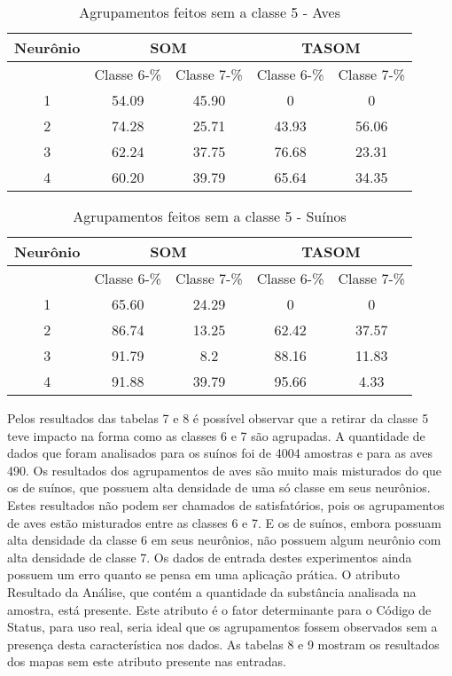 \begin{table}[h]
\centering
\caption{Agrupamentos feitos sem a classe 5 - Aves}
\label{my-label}
\begin{tabular}{|c|c|c|c|c|}
\hline
Neurônio & \multicolumn{2}{c|}{SOM} & \multicolumn{2}{c|}{TASOM} \\ \hline
         & Classe 6-\%    & Classe 7-\%   & Classe 6-\%     & Classe 7-\%   \\ \hline
1        & 54.09       & 45.90      & 0            & 0           \\ \hline
2        & 74.28           & 25.71          & 43.93        & 56.06       \\ \hline
3        & 62.24           & 37.75          & 76.68        & 23.31       \\ \hline
4        & 60.20       & 39.79      & 65.64        & 34.35       \\ \hline
\end{tabular}
\end{table}

\begin{table}[h]
\centering
\caption{Agrupamentos feitos sem a classe 5 - Suínos}
\label{my-label}
\begin{tabular}{|c|c|c|c|c|}
\hline
Neurônio & \multicolumn{2}{c|}{SOM} & \multicolumn{2}{c|}{TASOM} \\ \hline
         & Classe 6-\%    & Classe 7-\%   & Classe 6-\%     & Classe 7-\%    \\ \hline
1        & 65.60       & 24.29      & 0            & 0           \\ \hline
2        & 86.74           & 13.25          & 62.42        & 37.57       \\ \hline
3        & 91.79           & 8.2          & 88.16        & 11.83       \\ \hline
4        & 91.88       & 39.79      & 95.66        & 4.33        \\ \hline
\end{tabular}
\end{table}

Pelos resultados das tabelas 7 e 8 é possível observar que a retirar da classe 5 teve impacto na forma como as classes 6 e 7 são agrupadas. A quantidade de dados que foram analisados para os suínos foi de 4004 amostras e para as aves 490. Os resultados dos agrupamentos de aves são muito mais misturados do que os de suínos, que possuem alta densidade de uma só classe em seus neurônios. Estes resultados não podem ser chamados de satisfatórios, pois os agrupamentos de aves estão misturados entre as classes 6 e 7. E os de suínos, embora possuam alta densidade da classe 6 em seus neurônios, não possuem algum neurônio com alta densidade de classe 7. Os dados de entrada destes experimentos ainda possuem um erro quanto se pensa em uma aplicação prática. O atributo Resultado da Análise, que contém a quantidade da substância analisada na amostra, está presente. Este atributo é o fator determinante para o Código de Status, para uso real, seria ideal que os agrupamentos fossem observados sem a presença desta característica nos dados. As tabelas 8 e 9 mostram os resultados dos mapas sem este atributo presente nas entradas. 

